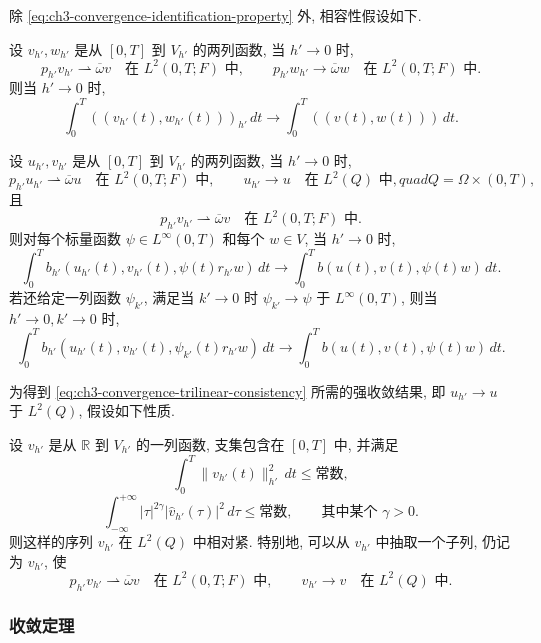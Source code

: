 除 \eqref{eq:ch3-convergence-identification-property} 外, 相容性假设如下.

设 $v_{h'},w_{h'}$ 是从 $[0,T]$ 到 $V_{h'}$ 的两列函数, 当 $h'\to0$ 时,
\[
p_{h'}v_{h'}\rightharpoonup\overline\omega v
\quad\text{在 }L^2(0,T;F)\text{ 中},
\qquad
p_{h'}w_{h'}\to\overline\omega w
\quad\text{在 }L^2(0,T;F)\text{ 中}.
\]
则当 $h'\to0$ 时,
\begin{equation}
\int_0^T((v_{h'}(t),w_{h'}(t)))_{h'}\,dt
\longrightarrow\int_0^T((v(t),w(t)))\,dt.
\label{eq:ch3-convergence-bilinear-consistency}
\end{equation}

设 $u_{h'},v_{h'}$ 是从 $[0,T]$ 到 $V_{h'}$ 的两列函数, 当 $h'\to0$ 时,
\[
p_{h'}u_{h'}\rightharpoonup\overline\omega u
\quad\text{在 }L^2(0,T;F)\text{ 中},
\qquad
u_{h'}\to u\quad\text{在 }L^2(Q)\text{ 中},quad Q=\Omega\times(0,T),
\]
且
\[
p_{h'}v_{h'}\rightharpoonup\overline\omega v
\quad\text{在 }L^2(0,T;F)\text{ 中}.
\]
则对每个标量函数 $\psi\in L^\infty(0,T)$ 和每个 $w\in V$, 当 $h'\to0$ 时,
\[
\int_0^Tb_{h'}(u_{h'}(t),v_{h'}(t),\psi(t)r_{h'}w)\,dt
\longrightarrow\int_0^Tb(u(t),v(t),\psi(t)w)\,dt.
\]
若还给定一列函数 $\psi_{k'}$, 满足当 $k'\to0$ 时 $\psi_{k'}\to\psi$ 于 $L^\infty(0,T)$, 则当 $h'\to0,k'\to0$ 时,
\begin{equation}
\int_0^Tb_{h'}(u_{h'}(t),v_{h'}(t),\psi_{k'}(t)r_{h'}w)\,dt
\longrightarrow\int_0^Tb(u(t),v(t),\psi(t)w)\,dt.
\label{eq:ch3-convergence-trilinear-consistency}
\end{equation}

为得到 \eqref{eq:ch3-convergence-trilinear-consistency} 所需的强收敛结果, 即 $u_{h'}\to u$ 于 $L^2(Q)$, 假设如下性质.

设 $v_{h'}$ 是从 $\mathbb R$ 到 $V_{h'}$ 的一列函数, 支集包含在 $[0,T]$ 中, 并满足
\[
\int_0^T\lVert v_{h'}(t)\rVert_{h'}^2\,dt\leq\text{常数},
\]
\[
\int_{-\infty}^{+\infty}|\tau|^{2\gamma}
|\widehat v_{h'}(\tau)|^2\,d\tau\leq\text{常数},
\qquad\text{其中某个 }\gamma>0.
\]
则这样的序列 $v_{h'}$ 在 $L^2(Q)$ 中相对紧. 特别地, 可以从 $v_{h'}$ 中抽取一个子列, 仍记为 $v_{h'}$, 使
\begin{equation}
p_{h'}v_{h'}\rightharpoonup\overline\omega v
\quad\text{在 }L^2(0,T;F)\text{ 中},
\qquad
v_{h'}\to v\quad\text{在 }L^2(Q)\text{ 中}.
\label{eq:ch3-convergence-compactness-property}
\end{equation}

\hypertarget{chapter-03-page-256}{}
\subsubsection{收敛定理}
\label{subsubsec:ch3-convergence-theorems}

